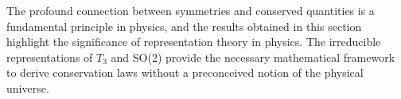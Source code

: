 The profound connection between symmetries and conserved quantities is a fundamental principle in physics, and the results obtained in this section highlight the significance of representation theory in physics. The irreducible representations of $T_3$ and SO(2) provide the necessary mathematical framework to derive conservation laws without a preconceived notion of the physical universe.






